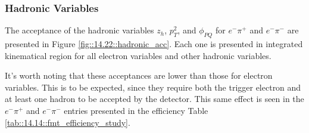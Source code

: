 \subsubsection{Hadronic Variables}
\label{14.22::hadronic_variables}
    The acceptance of the hadronic variables $z_h$, $p_T^2$, and $\phi_{PQ}$ for $e^-\pi^+$ and $e^-\pi^-$ are presented in Figure \ref{fig::14.22::hadronic_acc}.
    Each one is presented in integrated kinematical region for all electron variables and other hadronic variables.

    It's worth noting that these acceptances are lower than those for electron variables.
    This is to be expected, since they require both the trigger electron and at least one hadron to be accepted by the detector.
    This same effect is seen in the $e^-\pi^+$ and $e^-\pi^-$ entries presented in the efficiency Table \ref{tab::14.14::fmt_efficiency_study}.


